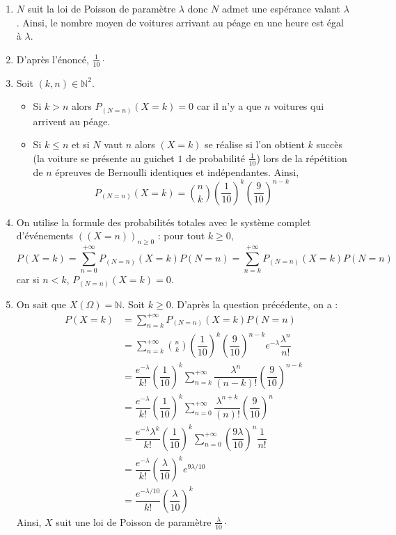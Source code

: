 \documentclass[a4paper,10pt]{report}
\begin{document}
\begin{enumerate}
\item $N$ suit la loi de Poisson de paramètre $\lambda$ donc $N$ admet une espérance valant $\lambda$. Ainsi,  le nombre moyen de voitures arrivant au péage en une heure est égal à $\lambda$.
\item D'après l'énoncé, $\tfrac{1}{10} \cdot$ 
\item Soit $(k,n) \in \mathbb{N}^2$.
\begin{itemize}
\item Si $k>n$ alors $P_{(N=n)}(X=k) = 0$ car il n'y a que $n$ voitures qui arrivent au péage.
\item Si $k \leq n$ et si $N$ vaut $n$ alors $(X=k)$ se réalise si l'on obtient $k$ succès (\og la voiture se présente au guichet $1$ \fg{} de probabilité $\tfrac{1}{10}$) lors de la répétition de $n$ épreuves de Bernoulli identiques et indépendantes. Ainsi,
$$ P_{(N=n)}(X=k) = \binom{n}{k} \left( \dfrac{1}{10} \right)^k  \left( \dfrac{9}{10} \right)^{n-k}$$
\end{itemize}

\item On utilise la formule des probabilités totales avec le système complet d'événements $((X=n))_{n \geq 0}$ : pour tout $k \geq 0$,
$$ P(X=k)=\sum_{n=0}^{+\infty}P_{(N=n)}(X=k) P(N=n) =\sum_{n=k}^{+\infty}P_{(N=n)}(X=k) P(N=n)$$
car si $n<k$, $P_{(N=n)}(X=k)=0$.
\item On sait que $X(\Omega) = \mathbb{N}$. Soit $k \geq 0$. D'après la question précédente, on a :
\begin{align*}
P(X=k) & = \sum_{n=k}^{+\infty}P_{(N=n)}(X=k) P(N=n) \\
& = \sum_{n=k}^{+\infty} \binom{n}{k}  \left( \dfrac{1}{10} \right)^k  \left( \dfrac{9}{10} \right)^{n-k} e^{- \lambda} \dfrac{\lambda^n}{n!} \\
& = \dfrac{e^{-\lambda}}{k!}\left( \dfrac{1}{10} \right)^k \sum_{n=k}^{+\infty} \dfrac{\lambda^n}{(n-k)!} \left( \dfrac{9}{10} \right)^{n-k} \\
& = \dfrac{e^{-\lambda}}{k!}\left( \dfrac{1}{10} \right)^k \sum_{n=0}^{+\infty} \dfrac{\lambda^{n+k}}{(n)!} \left( \dfrac{9}{10} \right)^{n} \\
& =  \dfrac{e^{-\lambda} \lambda^k }{k!}\left( \dfrac{1}{10} \right)^k \sum_{n=0}^{+\infty} \left( \dfrac{9 \lambda}{10} \right)^n \dfrac{1}{n!} \\
& = \dfrac{e^{-\lambda}}{k!}\left( \dfrac{\lambda}{10} \right)^k e^{9 \lambda/10} \\
& =  \dfrac{e^{-\lambda/10}}{k!}\left( \dfrac{\lambda}{10} \right)^k
\end{align*}
Ainsi, $X$ suit une loi de Poisson de paramètre $\tfrac{\lambda}{10} \cdot$
\end{enumerate}
\end{document}
